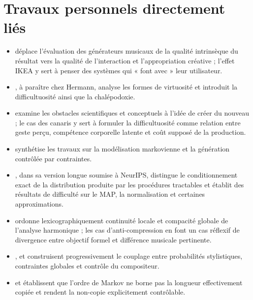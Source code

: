 \documentclass[11pt,a4paper]{article}
\begin{document}
\clearpage
\section{Travaux personnels directement liés}

\begin{itemize}
  \item \textcite{pachet2026generation} déplace l'évaluation des générateurs
        musicaux de la qualité intrinsèque du résultat vers la qualité de
        l'interaction et l'appropriation créative ; l'effet IKEA y sert à penser
        des systèmes qui « font avec » leur utilisateur.
  \item \textcite{pachet2027virtuosite}, à paraître chez Hermann, analyse les
        formes de virtuosité et introduit la difficultuosité ainsi que la
        chalépodoxie.
  \item \textcite{pachet2026impossibilite} examine les obstacles scientifiques
        et conceptuels à l'idée de créer du nouveau ; le cas des canaris y sert à
        formuler la difficultuosité comme relation entre geste perçu, compétence
        corporelle latente et coût supposé de la production.
  \item \textcite{pachet2026markov} synthétise les travaux sur la modélisation
        markovienne et la génération contrôlée par contraintes.
  \item \textcite{pachet2026biases}, dans sa version longue soumise à NeurIPS,
        distingue le conditionnement exact de la distribution produite par les
        procédures tractables et établit des résultats de difficulté sur le MAP,
        la normalisation et certaines approximations.
  \item \textcite{pachet2026tonalparsimony} ordonne lexicographiquement continuité
        locale et compacité globale de l'analyse harmonique ; les cas
        d'anti-compression en font un cas réflexif de divergence entre objectif
        formel et différence musicale pertinente.
  \item \textcite{pachet2011markov}, \textcite{barbieri2012lyrics} et
        \textcite{papadopoulos2016flowcomposer} construisent progressivement le
        couplage entre probabilités stylistiques, contraintes globales et contrôle
        du compositeur.
  \item \textcite{papadopoulos2014avoiding} et
        \textcite{papadopoulos2016nonplagiaristic} établissent que l'ordre de
        Markov ne borne pas la longueur effectivement copiée et rendent la
        non-copie explicitement contrôlable.

\end{itemize}
\end{document}
